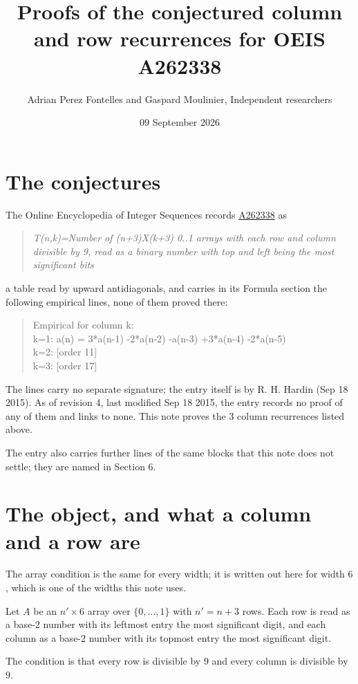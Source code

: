 \documentclass[11pt]{article}
\title{Proofs of the conjectured column and row recurrences for OEIS A262338}
\author{Adrian Perez Fontelles and Gaspard Moulinier, Independent researchers}
\date{09 September 2026}
\theoremstyle{definition}
\begin{document}
\maketitle
\section{The conjectures}

The Online Encyclopedia of Integer Sequences records \href{https://oeis.org/A262338}{A262338} as

\begin{quote}\itshape T(n,k)=Number of (n+3)X(k+3) 0..1 arrays with each row and column divisible by 9, read as a binary number with top and left being the most significant bits\end{quote}

a table read by upward antidiagonals, and carries in its Formula section the following empirical lines, none of them proved there:

\begin{quote}\ttfamily Empirical for column k:\\
k=1: a(n) = 3*a(n-1) -2*a(n-2) -a(n-3) +3*a(n-4) -2*a(n-5)\\k=2: [order 11]\\k=3: [order 17]\end{quote}

The lines carry no separate signature; the entry itself is by R. H. Hardin (Sep 18 2015). As of revision 4, last modified Sep 18 2015, the entry records no proof of any of them and links to none. This note proves the 3 column recurrences listed above.

The entry also carries further lines of the same blocks that this note does not settle; they are named in Section 6.

\section{The object, and what a column and a row are}

The array condition is the same for every width; it is written out here for width $6$, which is one of the widths this note uses.

Let $A$ be an $n' \times 6$ array over $\{0,\dots,1\}$ with $n' = n + 3$ rows. Each row is read as a base-$2$ number with its leftmost entry the most significant digit, and each column as a base-$2$ number with its topmost entry the most significant digit.

The condition is that every row is divisible by $9$ and every column is divisible by $9$.
\end{document}
